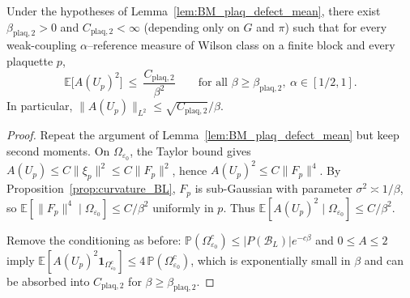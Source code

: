 \begin{lemma}\label{lem:BM_plaq_defect_L2}
Under the hypotheses of Lemma~\ref{lem:BM_plaq_defect_mean}, there exist $\beta_{\mathrm{plaq},2}>0$ and $C_{\mathrm{plaq},2}<\infty$
(depending only on $G$ and $\pi$) such that for every weak-coupling $\alpha$--reference measure of Wilson class on a finite block and every plaquette $p$,
\begin{equation}\label{eq:BM_plaq_defect_L2}
\mathbb E\!\big[A(U_p)^2\big] \ \le\ \frac{C_{\mathrm{plaq},2}}{\beta^2}
\qquad\text{for all }\beta\ge \beta_{\mathrm{plaq},2},\ \alpha\in[1/2,1].
\end{equation}
In particular, $\|A(U_p)\|_{L^2}\le \sqrt{C_{\mathrm{plaq},2}}/\beta$.
\end{lemma}
\begin{proof}
Repeat the argument of Lemma~\ref{lem:BM_plaq_defect_mean} but keep second moments.
On $\Omega_{\varepsilon_0}$, the Taylor bound gives $A(U_p)\le C\|\xi_p\|^2\le C\|F_p\|^2$, hence $A(U_p)^2\le C\|F_p\|^4$.
By Proposition~\ref{prop:curvature_BL}, $F_p$ is sub-Gaussian with parameter $\sigma^2\asymp 1/\beta$, so $\mathbb E[\|F_p\|^4\mid\Omega_{\varepsilon_0}]\le C/\beta^2$
uniformly in $p$.
Thus $\mathbb E[A(U_p)^2\mid\Omega_{\varepsilon_0}]\le C/\beta^2$.

Remove the conditioning as before: $\mathbb P(\Omega_{\varepsilon_0}^c)\le |P(\mathcal B_L)|e^{-c\beta}$ and $0\le A\le 2$ imply
$\mathbb E[A(U_p)^2\mathbf 1_{\Omega_{\varepsilon_0}^c}]\le 4\,\mathbb P(\Omega_{\varepsilon_0}^c)$, which is exponentially small in $\beta$ and can be absorbed into $C_{\mathrm{plaq},2}$
for $\beta\ge \beta_{\mathrm{plaq},2}$.
\end{proof}



